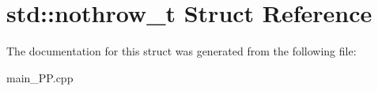 \hypertarget{structstd_1_1nothrow__t}{\section{std\+:\+:nothrow\+\_\+t Struct Reference}
\label{structstd_1_1nothrow__t}
}


The documentation for this struct was generated from the following file\+:\begin{DoxyCompactItemize}
\item 
main\+\_\+\+P\+P.\+cpp\end{DoxyCompactItemize}
